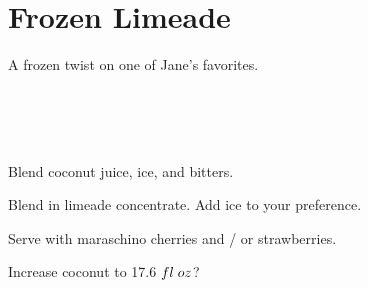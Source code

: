 \section[Frozen Limeade]{Frozen Limeade~\vegan}


\begin{recipestats}[
	servings=8 people,
	preptime=10 \minute,
	source=Mike \& Jane,
]
\end{recipestats}


\begin{recipeabstract}
	A frozen twist on one of Jane's favorites.
\end{recipeabstract}


\begin{ingredientcolumns}[1]
	\begin{ingredientblock}
		\\
		\\
		\\
	\end{ingredientblock}
\end{ingredientcolumns}


\begin{preparation}
\item Blend coconut juice, ice, and bitters.

\item Blend in limeade concentrate.
	Add ice to your preference.
\end{preparation}


\begin{variation}
\item Serve with maraschino cherries and / or strawberries.
\end{variation}


\begin{experiments}
\item Increase coconut to 17.6 $fl\;oz$?
\end{experiments}

\recipeend
